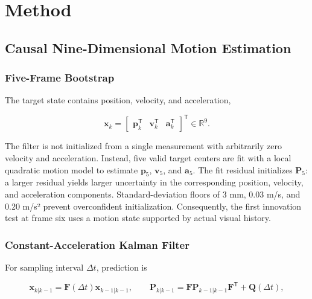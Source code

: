 \documentclass[conference]{IEEEtran}
\begin{document}
\section{Method}

\subsection{Causal Nine-Dimensional Motion Estimation}

\subsubsection{Five-Frame Bootstrap}

The target state contains position, velocity, and acceleration,

\begin{equation}
\mathbf{x}_k=
\begin{bmatrix}
\mathbf{p}_k^{\mathsf T}&\mathbf{v}_k^{\mathsf T}&\mathbf{a}_k^{\mathsf T}
\end{bmatrix}^{\mathsf T}\in\mathbb{R}^{9}.

\end{equation}

The filter is not initialized from a single measurement with arbitrarily zero velocity and acceleration. Instead, five valid target centers are fit with a local quadratic motion model to estimate \(\mathbf{p}_5\), \(\mathbf{v}_5\), and \(\mathbf{a}_5\). The fit residual initializes \(\mathbf{P}_5\): a larger residual yields larger uncertainty in the corresponding position, velocity, and acceleration components. Standard-deviation floors of 3 mm, 0.03 m/s, and 0.20 m/s² prevent overconfident initialization. Consequently, the first innovation test at frame six uses a motion state supported by actual visual history.

\subsubsection{Constant-Acceleration Kalman Filter}

For sampling interval \(\Delta t\), prediction is

\begin{equation}
\mathbf{x}_{k|k-1}=\mathbf{F}(\Delta t)\mathbf{x}_{k-1|k-1},\qquad
\mathbf{P}_{k|k-1}=\mathbf{F}\mathbf{P}_{k-1|k-1}\mathbf{F}^{\mathsf T}+\mathbf{Q}(\Delta t),

\end{equation}
\end{document}
